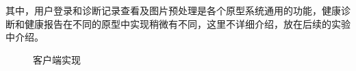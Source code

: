 其中，用户登录和诊断记录查看及图片预处理是各个原型系统通用的功能，健康诊断和健康报告在不同的原型中实现稍微有不同，这里不详细介绍，放在后续的实验中介绍。


\begin{figure}[h]
    \centering
    \caption{客户端实现}
    \label{fig:client}
\end{figure}


